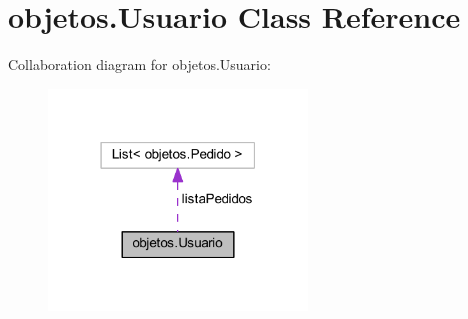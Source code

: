 \hypertarget{classobjetos_1_1_usuario}{}\section{objetos.\+Usuario Class Reference}
\label{classobjetos_1_1_usuario}


Collaboration diagram for objetos.\+Usuario\+:\nopagebreak
\begin{figure}[H]
\begin{center}
\leavevmode
\includegraphics[width=195pt]{classobjetos_1_1_usuario__coll__graph}
\end{center}
\end{figure}
